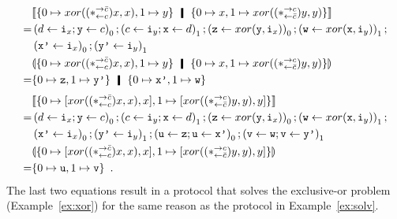 \begin{example}
  \begin{align*}
&\llbracket
 {\{
  0\mapsto {xor((\comodL)x,x)}, 1\mapsto {y}
  \}}
  \hmid
  {\{
  0\mapsto {x},
  1\mapsto {xor((\comodR)y, y)}
  \}}
   \rrbracket\phantom{\hmid}\\
   =& \left(d\leftarrow \p i_x; \p y\leftarrow c\right)_0;
 \left(c\leftarrow \p i_y; \p x\leftarrow d\right)_1;
 \left(\p z\leftarrow xor(\p y,\p i_x)\right)_0;
 \left(\p w\leftarrow xor(\p x,\p i_y)\right)_1; \\
   & \left(\p{x'}\leftarrow \p i_x\right)_0;
     \left(\p{y'}\leftarrow \p i_y\right)_1 \\
&\llparenthesis
 {\{
  0\mapsto {xor((\comodL)x,x)}, 1\mapsto {y}
  \}}
  \hmid
  {\{
  0\mapsto {x},
  1\mapsto {xor((\comodR)y, y)}
  \}}
  \rrparenthesis\phantom{\hmid}\\
   =&
   \{0\mapsto \p z, 1\mapsto \p{y'}\} \hmid \{0\mapsto\p{x'}, 1\mapsto
   \p w\}
  \end{align*}
  \begin{align*}
   &\llbracket{
   \{
   0\mapsto [{{xor((\ast^{\rightarrow {\bar{c}}}_{\leftarrow{c}})x,x)},x}],
   1\mapsto [{{xor((\ast^{\rightarrow {c}}_{\leftarrow{\bar{c}}})y,y)},y}]
   \}}\rrbracket
   \\
   =&\left(d\leftarrow \texttt{i}_x; \texttt{y}\leftarrow c\right)_0;
   \left(c\leftarrow \texttt{i}_y; \texttt{x}\leftarrow d\right)_1;
   \left(\texttt{z}\leftarrow xor(\texttt{y},\texttt{i}_x)\right)_0;
   \left(\texttt{w}\leftarrow xor(\texttt{x},\texttt{i}_y)\right)_1; \\
   & \left(\texttt{x'}\leftarrow \texttt{i}_x\right)_0;
     \left(\texttt{y'}\leftarrow \texttt{i}_y\right)_1;
   \left(\texttt{u} \leftarrow \texttt{z}; \texttt{u} \leftarrow \texttt{x'}\right)_0 ;
   \left(\texttt{v}\leftarrow \texttt{w}; \texttt{v} \leftarrow \texttt{y'}\right)_1
   \\
   &\llparenthesis{
   \{
   0\mapsto [{{xor((\ast^{\rightarrow {\bar{c}}}_{\leftarrow{c}})x,x)},x}],
   1\mapsto [{{xor((\ast^{\rightarrow {c}}_{\leftarrow{\bar{c}}})y,y)},y}]
   \}}\rrparenthesis
   \\
   =&\{0\mapsto\texttt{u},1\mapsto \texttt{v}\}\enspace.
  \end{align*}
  The last two equations result in a protocol that solves the
  exclusive-or problem (Example~\ref{ex:xor}) for the same reason as the
  protocol in Example~\ref{ex:solv}.
 \end{example}

